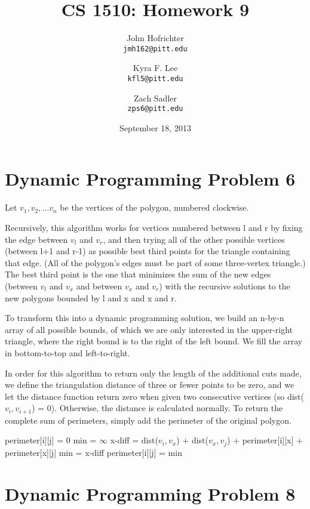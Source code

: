 \documentclass[12pt]{article}
\title{CS 1510: Homework 9}
\author{
John Hofrichter\\\texttt{jmh162@pitt.edu}
\and
Kyra F. Lee \\\texttt{kfl5@pitt.edu}
\and
Zach Sadler \\\texttt{zps6@pitt.edu}}
\date{September 18, 2013}
\begin{document}
\maketitle
\section*{Dynamic Programming Problem 6}
	Let $v_{1}, v_{2}, \ldots v_{n}$ be the vertices of the polygon, numbered clockwise.
	
	Recursively, this algorithm works for vertices numbered between l and r by fixing the edge between
	$v_{l}$ and $v_{r}$, and then trying all of the other possible vertices (between l+1 and r-1) as possible
	best third points for the triangle containing that edge. (All of the polygon's edges must be part of
	some three-vertex triangle.) The best third point is the one that minimizes the sum of the new edges
	(between $v_{l}$ and $v_{x}$ and between $v_{x}$ and $v_{r}$) with the recursive solutions to the
	new polygons bounded by l and x and x and r.
	
	To transform this into a dynamic programming solution, we build an n-by-n array of all possible
	bounds, of which we are only interested in the upper-right triangle, where the right bound is to the
	right of the left bound. We fill the array in bottom-to-top and left-to-right.
	
	In order for this algorithm to return only the length of the additional cuts made, we define the
	triangulation distance of three or fewer points to be zero, and we let the distance function return zero
	when given two consecutive vertices (so dist($v_{i}, v_{i+1}$) = 0). Otherwise, the distance is calculated
	normally. To return the complete sum of perimeters, simply add the perimeter of the original polygon.
	\begin{algorithmic}
					\STATE perimeter[i][j] = 0
				\ELSE
					\STATE min = $\infty$
						\STATE x-diff = dist($v_{i}, v_{x}$) + dist($v_{x}, v_{j}$) + perimeter[i][x] + perimeter[x][j]
							\STATE min = x-diff
						\ENDIF
					\ENDFOR
					\STATE perimeter[i][j] = min
				\ENDIF
			\ENDFOR
		\ENDFOR
	\end{algorithmic}
	
\section*{Dynamic Programming Problem 8}
\end{document}

